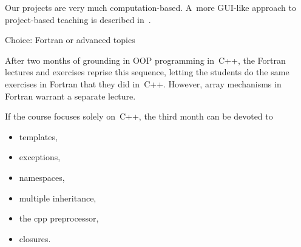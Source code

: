Our projects are very much computation-based. A~more GUI-like approach
to project-based teaching is described
in~\cite{Chen:2012:project-cpp}.

 {Choice: Fortran or advanced topics}

After two months of grounding in OOP programming in~C++, the Fortran
lectures and exercises reprise this sequence, letting the students do
the same exercises in Fortran that they did in~C++.  However, array
mechanisms in Fortran warrant a separate lecture.

If the course focuses solely on~C++, the third month can be devoted to
\begin{itemize}
\item templates,
\item exceptions,
\item namespaces,
\item multiple inheritance,
\item the cpp preprocessor,
\item closures.
\end{itemize}

